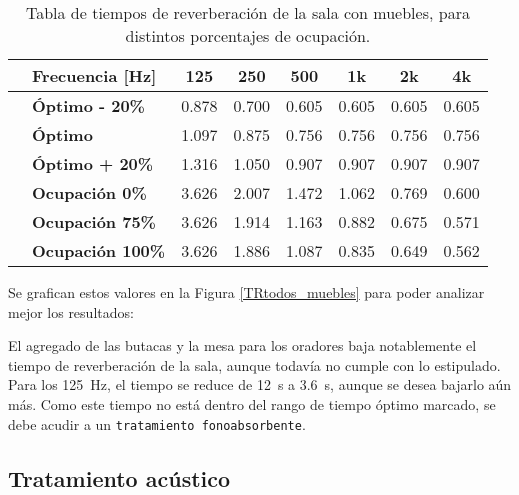 		\begin{table}[H]
			\centering
			\begin{tabular}{@{}clcccccc@{}}
				& \textbf{Frecuencia [Hz]} & \textbf{125} & \textbf{250} & \textbf{500} & \textbf{1k} & \textbf{2k} & \textbf{4k}   \\ \toprule
				\multirow{6}{*}{\textbf{\rotatebox[origin=c]{90}{\parbox{3.2cm}{\quad Tiempo de \\ reverberación [s]}}}} & \textbf{Óptimo - 20\%}		& 0.878 & 0.700 & 0.605 & 0.605 & 0.605 & 0.605 \\ \cmidrule{2-8}
					& \textbf{Óptimo}				& 1.097 & 0.875 & 0.756 & 0.756 & 0.756 & 0.756 \\ \cmidrule{2-8}
					& \textbf{Óptimo + 20\%}		& 1.316 & 1.050 & 0.907 & 0.907 & 0.907 & 0.907 \\ \cmidrule{2-8}
					& \textbf{Ocupación 0\%}				& 3.626 & 2.007 & 1.472 & 1.062 & 0.769 & 0.600 \\ \cmidrule{2-8}
					& \textbf{Ocupación 75\%}				& 3.626 & 1.914 & 1.163 & 0.882 & 0.675 & 0.571 \\ \cmidrule{2-8}
					& \textbf{Ocupación 100\%}			& 3.626 & 1.886 & 1.087 & 0.835 & 0.649 & 0.562 \\ \bottomrule
			\end{tabular}%
			\caption{Tabla de tiempos de reverberación de la sala con muebles, para distintos porcentajes de ocupación.}
			\label{tabla:tr_finales_muebles}
		\end{table}
		
		Se grafican estos valores en la Figura \ref{TRtodos_muebles} para poder analizar mejor los resultados:
		
		
		El agregado de las butacas y la mesa para los oradores baja notablemente el tiempo de reverberación de la sala, aunque todavía no cumple con lo estipulado. Para los \SI{125}{\Hz}, el tiempo se reduce de \SI{12}{\s} a \SI{3.6}{\s}, aunque se desea bajarlo aún más. Como este tiempo no está dentro del rango de tiempo óptimo marcado, se debe acudir a un \texttt{tratamiento fonoabsorbente}.

\subsection{Tratamiento acústico}
		
